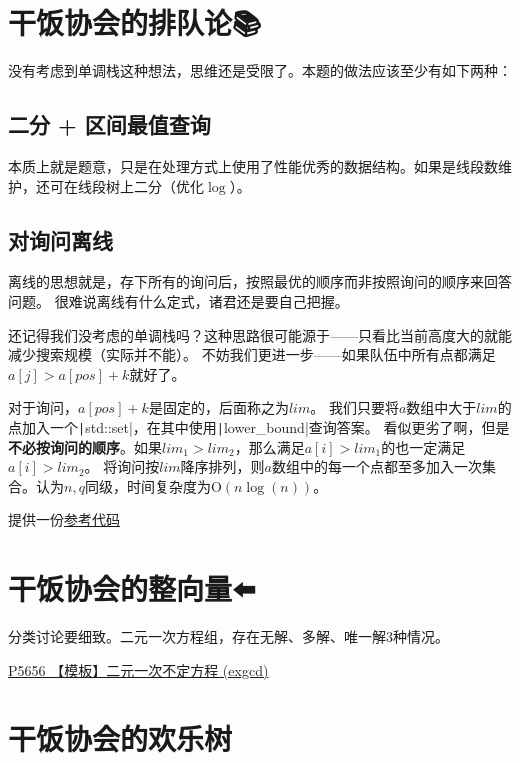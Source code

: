 \documentclass[11pt, UTF8]{ctexart}
\theoremstyle{mystyle} %
\begin{document}
\section{干饭协会的排队论{\EmojiFont 📚}}

没有考虑到单调栈这种想法，思维还是受限了。本题的做法应该至少有如下两种：

\subsection*{二分 + 区间最值查询}
本质上就是题意，只是在处理方式上使用了性能优秀的数据结构。如果是线段数维护，还可在线段树上二分（优化$\log$）。

\subsection*{对询问离线}
离线的思想就是，存下所有的询问后，按照最优的顺序而非按照询问的顺序来回答问题。
很难说离线有什么定式，诸君还是要自己把握。\par

还记得我们没考虑的单调栈吗？这种思路很可能源于——只看比当前高度大的就能减少搜索规模（实际并不能）。
不妨我们更进一步——如果队伍中所有点都满足$a[j]>a[pos]+k$就好了。\par

对于询问，$a[pos]+k$是固定的，后面称之为$lim$。
我们只要将$a$数组中大于$lim$的点加入一个\texttt|std::set|，在其中使用\texttt|lower_bound|查询答案。
看似更劣了啊，但是\textbf{不必按询问的顺序}。如果$lim_1>lim_2$，那么满足$a[i]>lim_1$的也一定满足$a[i]>lim_2$。
将询问按$lim$降序排列，则$a$数组中的每一个点都至多加入一次集合。认为$n,q$同级，时间复杂度为$\mathrm{O}(n\log(n))$。

提供一份\href{https://acm.csust.edu.cn/status/49701411403c35a7abe6d619987517ca}{参考代码}

\section{干饭协会的整向量{\EmojiFont ⬅️}}

分类讨论要细致。二元一次方程组，存在无解、多解、唯一解3种情况。\par
\href{https://www.luogu.com.cn/problem/P5656}{P5656 【模板】二元一次不定方程 (exgcd)}

\section{干饭协会的欢乐树{\EmojiFont 🌳}}
\end{document}
